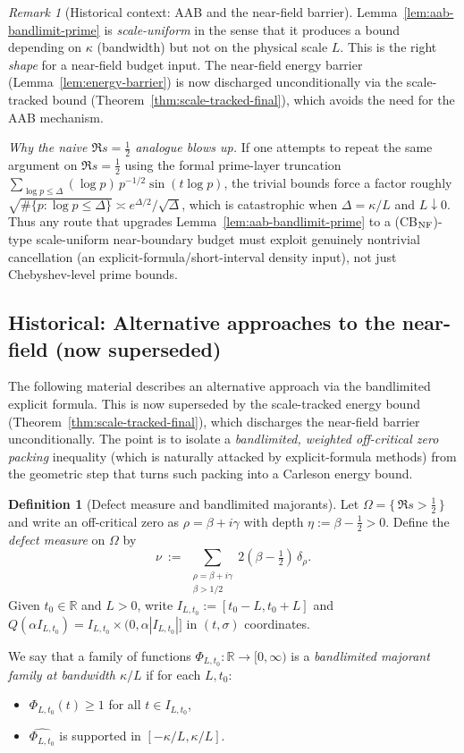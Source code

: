 \documentclass[11pt]{article}
\theoremstyle{definition}
\newtheorem{definition}[theorem]{Definition}
\theoremstyle{remark}
\newtheorem{remark}[theorem]{Remark}
\theoremstyle{definition}
\newcommand{\R}{\mathbb{R}}
\begin{document}
\begin{remark}[Historical context: AAB and the near-field barrier]\label{rem:aab-cbnf}
Lemma~\ref{lem:aab-bandlimit-prime} is \emph{scale-uniform} in the sense that it produces a bound depending on $\kappa$ (bandwidth) but not on the physical scale $L$.
This is the right \emph{shape} for a near-field budget input.
The near-field energy barrier (Lemma~\ref{lem:energy-barrier}) is now discharged unconditionally via the scale-tracked bound (Theorem~\ref{thm:scale-tracked-final}), which avoids the need for the AAB mechanism.
\smallskip

\noindent\emph{Why the naive $\Re s=\tfrac12$ analogue blows up.}
If one attempts to repeat the same argument on $\Re s=\tfrac12$ using the formal prime-layer truncation
$\sum_{\log p\le \Delta}(\log p)\,p^{-1/2}\sin(t\log p)$, the trivial bounds force a factor roughly
$\sqrt{\#\{p:\log p\le\Delta\}}\asymp e^{\Delta/2}/\sqrt{\Delta}$, which is catastrophic when $\Delta=\kappa/L$ and $L\downarrow 0$.
Thus any route that upgrades Lemma~\ref{lem:aab-bandlimit-prime} to a \textup{(CB$_{\rm NF}$)}-type scale-uniform near-boundary budget must exploit genuinely nontrivial cancellation (an explicit-formula/short-interval density input), not just Chebyshev-level prime bounds.
\end{remark}

\subsection*{Historical: Alternative approaches to the near-field (now superseded)}\label{sec:efbl-to-cbnf}
The following material describes an alternative approach via the bandlimited explicit formula. This is now superseded by the scale-tracked energy bound (Theorem~\ref{thm:scale-tracked-final}), which discharges the near-field barrier unconditionally.
The point is to isolate a \emph{bandlimited, weighted off-critical zero packing} inequality (which is naturally attacked by explicit-formula methods) from the geometric step that turns such packing into a Carleson energy bound.

\begin{definition}[Defect measure and bandlimited majorants]\label{def:defect-measure-bandlimit}
Let $\Omega=\{\,\Re s>\tfrac12\,\}$ and write an off-critical zero as $\rho=\beta+i\gamma$ with depth $\eta:=\beta-\tfrac12>0$.
Define the \emph{defect measure} on $\Omega$ by
\[
  \nu\ :=\ \sum_{\substack{\rho=\beta+i\gamma\\ \beta>1/2}} 2(\beta-\tfrac12)\,\delta_{\rho}.
\]
Given $t_0\in\R$ and $L>0$, write $I_{L,t_0}:=[t_0-L,t_0+L]$ and $Q(\alpha I_{L,t_0})=I_{L,t_0}\times(0,\alpha|I_{L,t_0}|]$ in $(t,\sigma)$ coordinates.

We say that a family of functions $\Phi_{L,t_0}:\R\to[0,\infty)$ is a \emph{bandlimited majorant family at bandwidth $\kappa/L$} if for each $L,t_0$:
\begin{itemize}
\item $\Phi_{L,t_0}(t)\ge 1$ for all $t\in I_{L,t_0}$,
\item $\widehat{\Phi_{L,t_0}}$ is supported in $[-\kappa/L,\kappa/L]$.
\end{itemize}
\end{definition}
\end{document}
